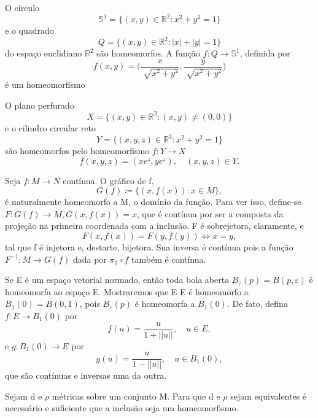 \documentclass[metric_notes.tex]{subfiles}
\begin{document}
\begin{example}
	O círculo
	\[
		\mathbb{S}^{1}=\{(x, y)\in \mathbb{R}^{2}: x^{2}+y^{2}=1\}
	\]
	e o quadrado
	\[
		Q = \{(x, y)\in \mathbb{R}^{2}: |x|+|y|=1\}
	\]
	do espaço euclidiano \(\mathbb{R}^{2}\) são homeomorfos. A função \(f:Q\rightarrow \mathbb{S}^{1}\),
	definida por
	\[
		f(x, y) = \biggl(\frac{x}{\sqrt[]{x^{2}+y^{2}}}, \frac{y}{\sqrt[]{x^{2}+y^{2}}}\biggr)
	\]
	é um homeomorfismo
\end{example}
\begin{example}
	O plano perfurado
	\[
		X = \{(x, y)\in \mathbb{R}^{2}: (x, y)\neq(0, 0)\}
	\]
	e o cilindro circular reto
	\[
		Y = \{(x, y, z)\in \mathbb{R}^{3}: x^{2}+y^{2}=1\}
	\]
	são homeomorfos pelo homeomorfismo \(f:Y\rightarrow X\)
	\[
		f(x, y, z) = (x e^{z}, y e^{z}),\quad (x, y, z)\in Y.
	\]
\end{example}
\begin{example}
	Seja \(f:M\rightarrow N\) contínua. O gráfico de f,
	\[
		G(f)\coloneqq \{(x, f(x)): x\in M\},
	\]
	é naturalmente homeomorfo a M, o domínio da função. Para ver isso, define-se
	\(F:G(f)\rightarrow M, G(x, f(x))=x\), que é contínua por ser a composta da projeção na primeira coordenada com a inclusão.
	F é sobrejetora, claramente, e
	\[
		F(x, f(x)) = F(y, f(y)) \Longleftrightarrow x = y,
	\]
	tal que f é injetora e, destarte, bijetora. Sua inversa é contínua pois a função
	\(F^{-1}:M\rightarrow G(f)\) dada por \(\pi_{1}\circ{f}\) também é contínua.
\end{example}
\begin{example}
	Se E é um espaço vetorial normado, então toda bola aberta \(B_{\varepsilon }(p) = B(p, \varepsilon )\)
	é homeomorfa ao espaço E. Mostraremos que E E é homeomorfo a \(B_{1}(0) = B(0, 1)\), pois \(B_{\varepsilon }(p)\)
	é homeomorfa a \(B_{1}(0).\) De fato, defina \(f:E\rightarrow B_{1}(0)\) por
	\[
		f(u) = \frac{u}{1+||u||},\quad u\in E,
	\]
	e \(g:B_{1}(0)\rightarrow E\) por
	\[
		g(u) = \frac{u}{1-||u||},\quad u\in B_{1}(0),
	\]
	que são contínuas e inversas uma da outra.
\end{example}
\begin{prop*}
	Sejam d e \(\rho \) métricas sobre um conjunto M. Para que d e \(\rho \) sejam equivalentes é
	necessário e suficiente que a inclusão seja um homeomorfismo.
\end{prop*}
\end{document}

